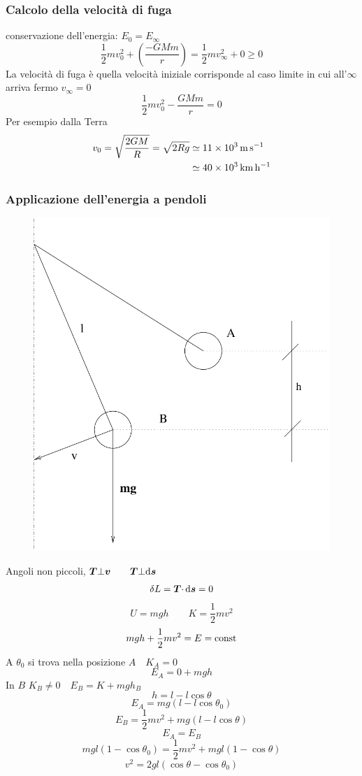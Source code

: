 \subsubsection{Calcolo della velocità di fuga}

conservazione dell'energia: $E_0=E_\infty$
\[\frac{1}{2}mv_0^2+\left(\frac{-GMm}{r}\right)=\frac{1}{2}mv_\infty^2+0\geq0\]
La velocità di fuga è quella velocità iniziale corrisponde al caso limite in cui all'$\infty$ arriva fermo $v_\infty=0$
\[\frac{1}{2}mv_0^2-\frac{GMm}{r}=0\]
Per esempio dalla Terra
\begin{align*}
  v_0=\sqrt{\frac{2GM}{R}}=\sqrt{2Rg} & \simeq \SI{11E3}{\meter\per\second}    \\
                                      & \simeq \SI{40E3}{\kilo\meter\per\hour}
\end{align*}



\subsubsection{Applicazione dell'energia a pendoli}
\begin{figure}[htbp]
  \centering
  \includegraphics[scale=0.4]{immagini/fisica1/Pendolo_energia}
\end{figure}
Angoli non piccoli, $\boldsymbol{T}\bot \boldsymbol{v} \qquad \boldsymbol{T}\bot \mathrm{d}\boldsymbol{s}$
\[\delta L=\boldsymbol{T} \cdotp \mathrm{d}\boldsymbol{s}=0\]
\[U=mgh \qquad K=\frac{1}{2}mv^2\]
\[mgh+\frac{1}{2}mv^2=E=\text{const}\]
A $\theta_0$ si trova nella posizione $A\quad K_A=0$
\[E_A=0+mgh\]
In $B$ $K_B\neq 0\quad E_B=K+mgh_B$
\[h=l-l\cos\theta\]
\[E_A=mg\left(l-l\cos\theta_0\right)\]
\[E_B=\frac{1}{2}mv^2+mg\left(l-l\cos\theta\right)\]
\[E_A=E_B\]
\[mgl\left(1-\cos\theta_0\right)=\frac{1}{2}mv^2+mgl\left(1-\cos\theta\right)\]
\[v^2=2gl(\cos\theta-\cos\theta_0)\]

